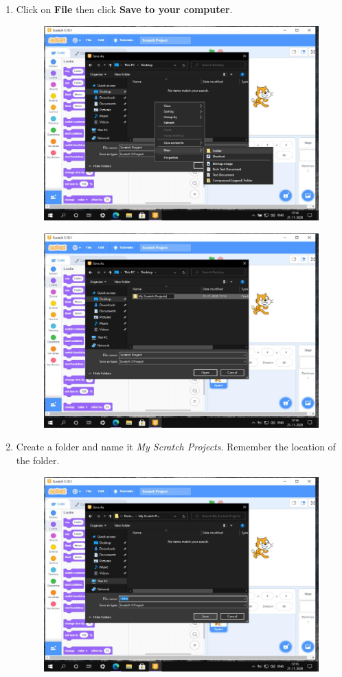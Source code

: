\documentclass[a4paper]{article}
\begin{document}
\begin{enumerate}
    \item Click on \textbf{File} then click \textbf{Save to your computer}.

          \begin{figure}[H]
              \centering
              \includegraphics[width = .8\linewidth]{09}
          \end{figure}

          \begin{figure}[H]
              \centering
              \includegraphics[width = .8\linewidth]{10}
          \end{figure}

    \item Create a folder and name it \textit{My Scratch Projects}. Remember the location of the folder.

          \begin{figure}[H]
              \centering
              \includegraphics[width = .8\linewidth]{11}
          \end{figure}


\end{enumerate}
\end{document}
